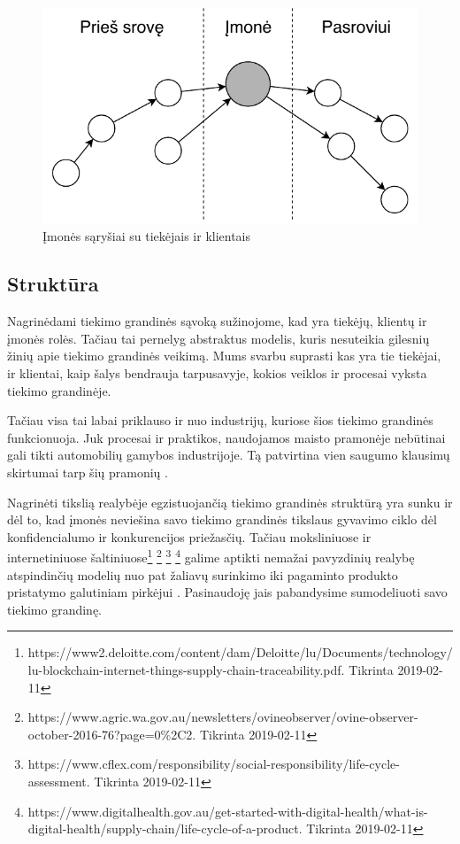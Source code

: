 \begin{figure}[H]
    \centering
    \includegraphics[scale=1]{images/supply-chain-upstream-downstream}
    \caption{Įmonės sąryšiai su tiekėjais ir klientais}
\end{figure}

\subsection{Struktūra}

Nagrinėdami tiekimo grandinės sąvoką sužinojome, kad yra tiekėjų, klientų ir įmonės rolės. Tačiau tai pernelyg abstraktus modelis, kuris nesuteikia gilesnių žinių apie tiekimo grandinės veikimą. Mums svarbu suprasti kas yra tie tiekėjai, ir klientai, kaip šalys bendrauja tarpusavyje, kokios veiklos ir procesai vyksta tiekimo grandinėje. 

Tačiau visa tai labai priklauso ir nuo industrijų, kuriose šios tiekimo grandinės funkcionuoja. Juk procesai ir praktikos, naudojamos maisto pramonėje nebūtinai gali tikti automobilių gamybos industrijoje. Tą patvirtina vien saugumo klausimų skirtumai tarp šių pramonių \cite{marucheck2011product}.

Nagrinėti tikslią realybėje egzistuojančią tiekimo grandinės struktūrą yra sunku ir dėl to, kad įmonės neviešina savo tiekimo grandinės tikslaus gyvavimo ciklo dėl konfidencialumo ir konkurencijos priežasčių. Tačiau moksliniuose ir internetiniuose šaltiniuose\footnote{https://www2.deloitte.com/content/dam/Deloitte/lu/Documents/technology/lu-blockchain-internet-things-supply-chain-traceability.pdf. Tikrinta 2019-02-11} \footnote{https://www.agric.wa.gov.au/newsletters/ovineobserver/ovine-observer-october-2016-76?page=0\%2C2. Tikrinta 2019-02-11} \footnote{https://www.cflex.com/responsibility/social-responsibility/life-cycle-assessment. Tikrinta 2019-02-11} \footnote{https://www.digitalhealth.gov.au/get-started-with-digital-health/what-is-digital-health/supply-chain/life-cycle-of-a-product. Tikrinta 2019-02-11} galime aptikti nemažai pavyzdinių realybę atspindinčių modelių nuo pat žaliavų surinkimo iki pagaminto produkto pristatymo galutiniam pirkėjui \cite{christopher2016logistics} \cite{webber2009building}. Pasinaudoję jais pabandysime sumodeliuoti savo tiekimo grandinę.

